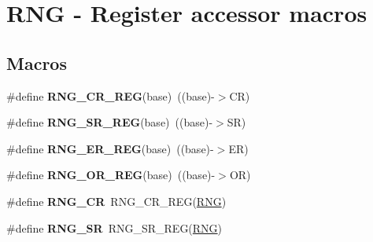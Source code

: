 \hypertarget{group__RNG__Register__Accessor__Macros}{}\section{R\+NG -\/ Register accessor macros}
\label{group__RNG__Register__Accessor__Macros}
\subsection*{Macros}
\begin{DoxyCompactItemize}
\item 
\#define {\bfseries R\+N\+G\+\_\+\+C\+R\+\_\+\+R\+EG}(base)~((base)-\/$>$CR)\hypertarget{group__RNG__Register__Accessor__Macros_gafc50342170fcdac13af1448420c0faec}{}\label{group__RNG__Register__Accessor__Macros_gafc50342170fcdac13af1448420c0faec}

\item 
\#define {\bfseries R\+N\+G\+\_\+\+S\+R\+\_\+\+R\+EG}(base)~((base)-\/$>$SR)\hypertarget{group__RNG__Register__Accessor__Macros_gafb84d311865d4d8f852f963a7acdd581}{}\label{group__RNG__Register__Accessor__Macros_gafb84d311865d4d8f852f963a7acdd581}

\item 
\#define {\bfseries R\+N\+G\+\_\+\+E\+R\+\_\+\+R\+EG}(base)~((base)-\/$>$ER)\hypertarget{group__RNG__Register__Accessor__Macros_ga75fdd093a7f129052b8d8324a6f2e400}{}\label{group__RNG__Register__Accessor__Macros_ga75fdd093a7f129052b8d8324a6f2e400}

\item 
\#define {\bfseries R\+N\+G\+\_\+\+O\+R\+\_\+\+R\+EG}(base)~((base)-\/$>$OR)\hypertarget{group__RNG__Register__Accessor__Macros_ga9f7f222db3030705a1af846556615811}{}\label{group__RNG__Register__Accessor__Macros_ga9f7f222db3030705a1af846556615811}

\item 
\#define {\bfseries R\+N\+G\+\_\+\+CR}~R\+N\+G\+\_\+\+C\+R\+\_\+\+R\+EG(\hyperlink{group__RNG__Peripheral__Access__Layer_ga5b0885b8b55bbc13691092b704d9309f}{R\+NG})\hypertarget{group__RNG__Register__Accessor__Macros_ga9f983dd60cadb7f93a7cbc3242bed807}{}\label{group__RNG__Register__Accessor__Macros_ga9f983dd60cadb7f93a7cbc3242bed807}

\item 
\#define {\bfseries R\+N\+G\+\_\+\+SR}~R\+N\+G\+\_\+\+S\+R\+\_\+\+R\+EG(\hyperlink{group__RNG__Peripheral__Access__Layer_ga5b0885b8b55bbc13691092b704d9309f}{R\+NG})\hypertarget{group__RNG__Register__Accessor__Macros_ga0c576b22e5f9deb46a5200be5eb9d456}{}\label{group__RNG__Register__Accessor__Macros_ga0c576b22e5f9deb46a5200be5eb9d456}


\end{DoxyCompactItemize}
